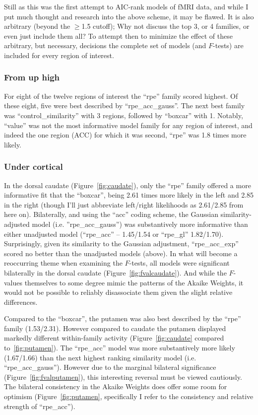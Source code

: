\documentclass[doc,12pt]{apa}        %
\begin{document}
Still as this was the first attempt to AIC-rank models of fMRI data, and while I put much thought and research into the above scheme, it may be flawed.  It is also arbitrary (beyond the $\ge$1.5 cutoff); Why not discuss the top 3, or 4 families, or even just include them all?  To attempt then to minimize the effect of these arbitrary, but necessary, decisions the complete set of models (and $F$-tests) are included for every region of interest.


\subsubsection{From up high}
\label{subsub:fromuphigh}
For eight of the twelve regions of interest the ``rpe'' family scored highest.  Of these eight, five were best described by ``rpe\_acc\_gauss''.  The next best family was ``control\_similarity'' with 3 regions, followed by ``boxcar'' with 1.  Notably, ``value'' was not the most informative model family for any region of interest, and indeed the one region (ACC) for which it was second, ``rpe'' was 1.8 times more likely.


\subsubsection{Under cortical}
\label{subsub:belowctx}
In the dorsal caudate (Figure~\ref{fig:caudate}), only the ``rpe'' family offered a more informative fit that the ``boxcar'', being 2.61 times more likely in the left and 2.85 in the right (though I'll just abbreviate left/right likelihoods as 2.61/2.85 from here on).  Bilaterally, and using the ``acc'' coding scheme, the Gaussian similarity-adjusted model (i.e. ''rpe\_acc\_gauss'') was substantively more informative than either unadjusted model (``rpe\_acc'' -- 1.45/1.54 or ``rpe\_gl'' 1.82/1.70).  Surprisingly, given its similarity to the Gaussian adjustment, ``rpe\_acc\_exp'' scored no better than the unadjusted models (above).  In what will become a reoccurring theme when examining the $F$-tests, all models were significant bilaterally in the dorsal caudate (Figure~\ref{fig:fvalcaudate}).  And while the $F$-values themselves to some degree mimic the patterns of the Akaike Weights, it would not be possible to reliably disassociate them given the slight relative differences.  

Compared to the ``boxcar'', the putamen was also best described by the ``rpe'' family (1.53/2.31).  However compared to caudate the putamen displayed markedly different within-family activity (Figure~\ref{fig:caudate} compared to~\ref{fig:putamen}). The ``rpe\_acc'' model was more substantively more likely (1.67/1.66) than the next highest ranking similarity model (i.e. ``rpe\_acc\_gauss'').  However due to the marginal bilateral significance (Figure~\ref{fig:fvalputamen}), this interesting reversal must be viewed cautiously.  The bilateral consistency in the Akaike Weights does offer some room for optimism (Figure~\ref{fig:putamen}, specifically I refer to the consistency and relative strength of ``rpe\_acc'').
\end{document}

